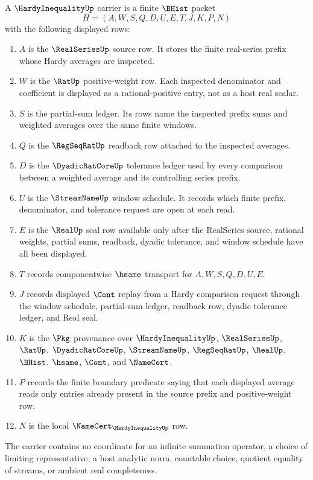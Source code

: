 \begin{definition}
\label{def:hardy-inequality-carrier}
A $\HardyInequalityUp$ carrier is a finite $\BHist$ packet
$$
H=(A,W,S,Q,D,U,E,T,J,K,P,N)
$$
with the following displayed rows:
\begin{enumerate}
\item $A$ is the $\RealSeriesUp$ source row. It stores the finite real-series prefix whose Hardy averages are inspected.
\item $W$ is the $\RatUp$ positive-weight row. Each inspected denominator and coefficient is displayed as a rational-positive entry, not as a host real scalar.
\item $S$ is the partial-sum ledger. Its rows name the inspected prefix sums and weighted averages over the same finite windows.
\item $Q$ is the $\RegSeqRatUp$ readback row attached to the inspected averages.
\item $D$ is the $\DyadicRatCoreUp$ tolerance ledger used by every comparison between a weighted average and its controlling series prefix.
\item $U$ is the $\StreamNameUp$ window schedule. It records which finite prefix, denominator, and tolerance request are open at each read.
\item $E$ is the $\RealUp$ seal row available only after the RealSeries source, rational weights, partial sums, readback, dyadic tolerance, and window schedule have all been displayed.
\item $T$ records componentwise $\hsame$ transport for $A,W,S,Q,D,U,E$.
\item $J$ records displayed $\Cont$ replay from a Hardy comparison request through the window schedule, partial-sum ledger, readback row, dyadic tolerance ledger, and Real seal.
\item $K$ is the $\Pkg$ provenance over $\HardyInequalityUp$, $\RealSeriesUp$, $\RatUp$, $\DyadicRatCoreUp$, $\StreamNameUp$, $\RegSeqRatUp$, $\RealUp$, $\BHist$, $\hsame$, $\Cont$, and $\NameCert$.
\item $P$ records the finite boundary predicate saying that each displayed average reads only entries already present in the source prefix and positive-weight row.
\item $N$ is the local $\NameCert_{\HardyInequalityUp}$ row.
\end{enumerate}
The carrier contains no coordinate for an infinite summation operator, a choice of limiting representative, a host analytic norm, countable choice, quotient equality of streams, or ambient real completeness.
\end{definition}

